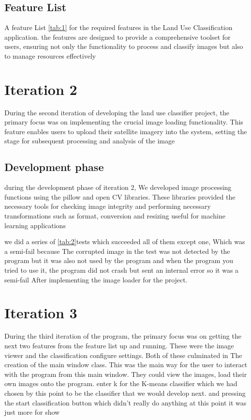 \subsection{Feature List}\label{subsec:feature-list}

A feature List \ref{tab:1} for the required features in the Land Use Classification application.
the features are designed to provide a comprehensive toolset for users, ensuring not only the functionality to process and classify
images but also to manage resources effectively


\section{Iteration 2}\label{sec:iteration-2}

During the second iteration of developing the land use classifier project,
the primary focus was on implementing the crucial image loading functionality.
This feature enables users to upload their satellite imagery into the system,
setting the stage for subsequent processing and analysis of the image

\subsection{Development phase}\label{subsec:development-phase}

during the development phase of iteration 2, We developed image processing functions using the pillow and open CV libraries.
These libraries provided the necessary tools for checking image integrity and performing necessary transformations such as format,
conversion and resizing useful for machine learning applications

we did a series of \ref{tab:2}tests which succeeded all of them except one,
Which was a semi-fail because The corrupted image in the test was not detected by the program
but it was also not used by the program and when the program you tried to use it,
the program did not crash but sent an internal error so it was a semi-fail
After implementing the image loader for the project.

\section{Iteration 3}\label{sec:iteration-3}

During the third iteration of the program, the primary focus was on getting the next two features from the feature list up and running.
These were the image viewer and the classification configure settings.
Both of these culminated in The creation of the main window class.
This was the main way for the user to interact with the program from this main window.
They could view the images, load their own images onto the program.
enter k for the K-means classifier which we had chosen by this point to be the classifier that we would develop next.
and pressing the start classification button which didn't really do anything at this point it was just more for show

